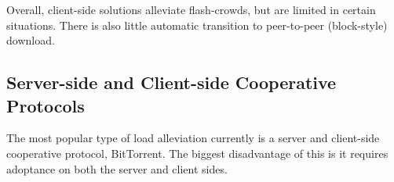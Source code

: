 
Overall, client-side solutions alleviate flash-crowds, but are limited in certain situations. There is also little automatic transition to peer-to-peer (block-style) download.

\subsection{Server-side and Client-side Cooperative Protocols} 

The most popular type of load alleviation currently is a server and client-side cooperative protocol, BitTorrent.  The biggest disadvantage of this is it requires adoptance on both the server and client sides.


